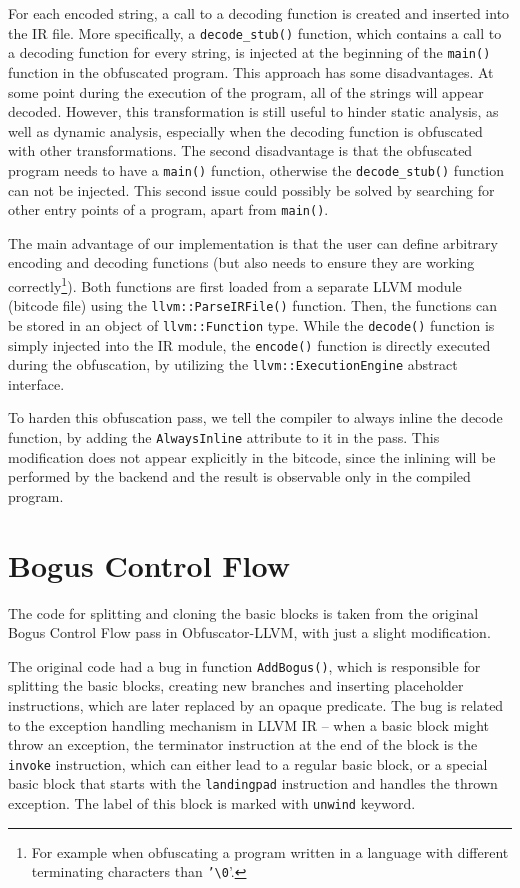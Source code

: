 \documentclass[
  digital, %
  notable,   %
  twoside, %
  nolof,     %
  nolot,     %
]{fithesis3}
\theoremstyle{definition}
\begin{document}
For each encoded string, a call to a decoding function is created and inserted into the IR file. More specifically, a \texttt{decode\_stub()} function, which contains a call to a decoding function for every string, is injected at the beginning of the \texttt{main()} function in the obfuscated program. This approach has some disadvantages. At some point during the execution of the program, all of the strings will appear decoded. However, this transformation is still useful to hinder static analysis, as well as dynamic analysis, especially when the decoding function is obfuscated with other transformations. The second disadvantage is that the obfuscated program needs to have a \texttt{main()} function, otherwise the \texttt{decode\_stub()} function can not be injected. This second issue could possibly be solved by searching for other entry points of a program, apart from \texttt{main()}.

The main advantage of our implementation is that the user can define arbitrary encoding and decoding functions (but also needs to ensure they are working correctly\footnote{For example when obfuscating a program written in a language with different terminating characters than \texttt{'\textbackslash0}'.}). Both functions are first loaded from a separate LLVM module (bitcode file) using the \texttt{llvm::ParseIRFile()} function. Then, the functions can be stored in an object of \texttt{llvm::Function} type. While the \texttt{decode()} function is simply injected into the IR module, the \texttt{encode()} function is directly executed during the obfuscation, by utilizing the \texttt{llvm::ExecutionEngine} abstract interface.

To harden this obfuscation pass, we tell the compiler to always inline the decode function, by adding the \texttt{AlwaysInline} attribute to it in the pass. This modification does not appear explicitly in the bitcode, since the inlining will be performed by the backend and the result is observable only in the compiled program. 

\section{Bogus Control Flow}
The code for splitting and cloning the basic blocks is taken from the original Bogus Control Flow pass in Obfuscator-LLVM, with just a slight modification. 

The original code had a bug in function \texttt{AddBogus()}, which is responsible for splitting the basic blocks, creating new branches and inserting placeholder instructions, which are later replaced by an opaque predicate. The bug is related to the exception handling mechanism in LLVM IR -- when a basic block might throw an exception, the terminator instruction at the end of the block is the \texttt{invoke} instruction, which can either lead to a regular basic block, or a special basic block that starts with the \texttt{landingpad} instruction and handles the thrown exception. The label of this block is marked with \texttt{unwind} keyword. 
\end{document}
